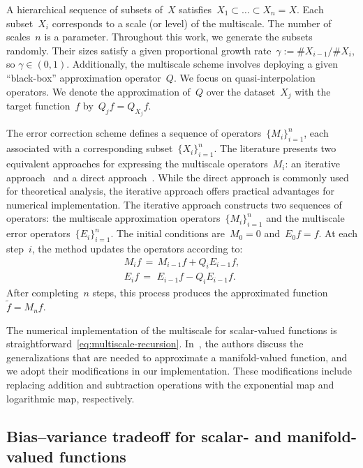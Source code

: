 \documentclass[12pt]{article}
\begin{document}
A hierarchical sequence of subsets of~$ X$ satisfies~$ X_1 \subset \ldots \subset X_n = X$. Each subset~$X_i$ corresponds to a scale (or level) of the multiscale. The number of scales~$n$ is a parameter. Throughout this work, we generate the subsets randomly. Their sizes satisfy a given proportional growth rate~$\gamma := {\#X_{i-1}}  /{\#X_i}$, so $\gamma \in (0,1)$. Additionally, the multiscale scheme involves deploying a given ``black-box'' approximation operator~$Q$. We focus on quasi-interpolation operators. We denote the approximation  of~$Q$ over the dataset~$X_j$ with the target function~$f$ by~$Q_j f = Q_{X_j} f$.

The error correction  scheme defines a sequence of operators~$\{M_i\}_{i=1}^n$, each associated with a corresponding subset~$\{X_i\}_{i=1}^n$. The literature presents two equivalent approaches for expressing the multiscale operators~$M_i$: an iterative approach~\cite{floater1996multistep} and a direct approach~\cite{franz2023multilevel}. While the direct approach is commonly used for theoretical analysis, the iterative approach offers practical advantages for numerical implementation. The iterative approach constructs two sequences of operators: the multiscale approximation operators~$\{M_i\}_{i=1}^n$ and the multiscale error operators~$\{E_i\}_{i=1}^n$. The initial conditions are~$M_0 = 0$ and~$E_0 f = f$. At each step~$i$, the method updates the operators according to:
\begin{equation} \label{eq:multiscale-recursion}
\begin{split}
    M_i f \, = \, M_{i-1} f + Q_iE_{i-1}f, \\
    E_i f \,= \,\,  E_{i-1}f - Q_i E_{i-1}f.
    \end{split}
\end{equation}
After completing~$n$ steps, this process produces the approximated function~$\widetilde{f} = M_n f$.

The numerical implementation of the multiscale for scalar-valued functions is straightforward~\eqref{eq:multiscale-recursion}. In~\cite{sharon2022multiscale}, the authors discuss the generalizations that are needed to approximate a manifold-valued function, and we adopt their modifications in our implementation. These modifications include replacing addition and subtraction operations with the exponential map and logarithmic map, respectively.

\subsection{Bias--variance tradeoff for scalar- and manifold-valued functions}\label{sec:bvt}
\end{document}
